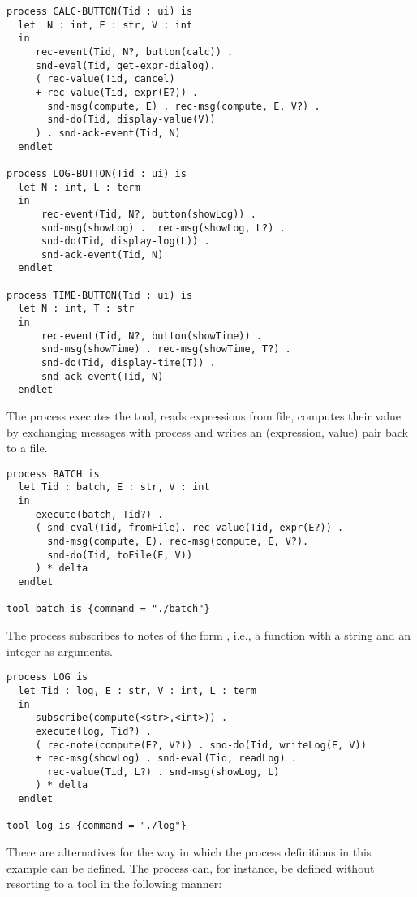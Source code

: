 \small
\begin{verbatim}
process CALC-BUTTON(Tid : ui) is
  let  N : int, E : str, V : int
  in
     rec-event(Tid, N?, button(calc)) .
     snd-eval(Tid, get-expr-dialog).
     ( rec-value(Tid, cancel)
     + rec-value(Tid, expr(E?)) .
       snd-msg(compute, E) . rec-msg(compute, E, V?) .
       snd-do(Tid, display-value(V))
     ) . snd-ack-event(Tid, N)
  endlet

process LOG-BUTTON(Tid : ui) is
  let N : int, L : term
  in
      rec-event(Tid, N?, button(showLog)) .
      snd-msg(showLog) .  rec-msg(showLog, L?) .
      snd-do(Tid, display-log(L)) .
      snd-ack-event(Tid, N)
  endlet

process TIME-BUTTON(Tid : ui) is
  let N : int, T : str
  in
      rec-event(Tid, N?, button(showTime)) .
      snd-msg(showTime) . rec-msg(showTime, T?) .
      snd-do(Tid, display-time(T)) .
      snd-ack-event(Tid, N)
  endlet

\end{verbatim}
\noindent
\normalsize
 The  process executes the  tool,
 reads expressions from file, computes their value by exchanging messages
 with process  and writes an (expression, value) pair
 back to a file.

\small
\begin{verbatim}
process BATCH is
  let Tid : batch, E : str, V : int
  in
     execute(batch, Tid?) .
     ( snd-eval(Tid, fromFile). rec-value(Tid, expr(E?)) .
       snd-msg(compute, E). rec-msg(compute, E, V?).
       snd-do(Tid, toFile(E, V))
     ) * delta
  endlet

tool batch is {command = "./batch"}

\end{verbatim}
\noindent
\normalsize
 The  process subscribes to notes of the form ,
 i.e., a function  with a string and an integer as arguments.

\small
\begin{verbatim}
process LOG is
  let Tid : log, E : str, V : int, L : term
  in
     subscribe(compute(<str>,<int>)) .
     execute(log, Tid?) .
     ( rec-note(compute(E?, V?)) . snd-do(Tid, writeLog(E, V))
     + rec-msg(showLog) . snd-eval(Tid, readLog) .
       rec-value(Tid, L?) . snd-msg(showLog, L)
     ) * delta
  endlet

tool log is {command = "./log"}

\end{verbatim}
\noindent
\normalsize
 There are alternatives for the way in which the process definitions
 in this example can be defined. The  process can, for instance,
 be defined without resorting to a tool in the following manner:


